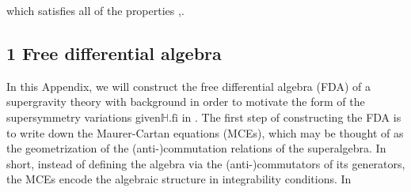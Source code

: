\documentclass{article}
\begin{document}
which satisfies all of the properties ,.


\subsection*{1 Free differential algebra}


In this Appendix, we will construct the free differential algebra (FDA) of a supergravity theory with background in order to motivate the form of the supersymmetry variations given$\mathbb { H } . { \mathrm { f i } }$
in . The first step of constructing the FDA is to write down the Maurer-Cartan equations
(MCEs), which may be thought of as the geometrization of the (anti-)commutation relations
of the superalgebra. In short, instead of defining the algebra via the (anti-)commutators of
its generators, the MCEs encode the algebraic structure in integrability conditions. In
\end{document}
